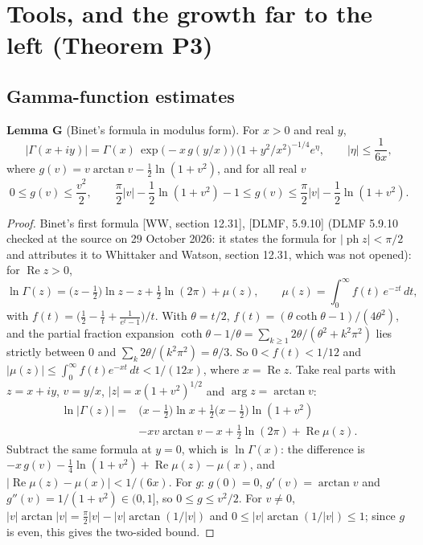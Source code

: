 \documentclass[11pt]{article}
\newcommand{\re}{\operatorname{Re}}
\begin{document}
\section{Tools, and the growth far to the left (Theorem P3)}\label{sec:P3}

\subsection{Gamma-function estimates}

\noindent\textbf{Lemma G} (Binet's formula in modulus form). For $x>0$ and real $y$,
\[
|\Gamma(x+iy)|=\Gamma(x)\,\exp\bigl(-x\,g(y/x)\bigr)\,\bigl(1+y^2/x^2\bigr)^{-1/4}e^{\eta},\qquad|\eta|\le\frac{1}{6x},
\]
where $g(v)=v\arctan v-\frac12\ln(1+v^2)$, and for all real $v$
\[
0\le g(v)\le\frac{v^2}{2},\qquad \frac\pi2|v|-\frac12\ln(1+v^2)-1\le g(v)\le\frac\pi2|v|-\frac12\ln(1+v^2).
\]

\begin{proof}
Binet's first formula [WW, section 12.31], [DLMF, 5.9.10] (DLMF 5.9.10 checked at the source on 29 October 2026: it states the formula for $|\operatorname{ph}z|<\pi/2$ and attributes it to Whittaker and Watson, section 12.31, which was not opened): for $\re z>0$,
\[
\ln\Gamma(z)=\bigl(z-\tfrac12\bigr)\ln z-z+\tfrac12\ln(2\pi)+\mu(z),\qquad \mu(z)=\int_0^\infty f(t)\,e^{-zt}\,dt,
\]
with $f(t)=\bigl(\frac12-\frac1t+\frac{1}{e^t-1}\bigr)/t$. With $\theta=t/2$, $f(t)=(\theta\coth\theta-1)/(4\theta^2)$, and the partial fraction expansion $\coth\theta-1/\theta=\sum_{k\ge1}2\theta/(\theta^2+k^2\pi^2)$ lies strictly between $0$ and $\sum_k2\theta/(k^2\pi^2)=\theta/3$. So $0<f(t)<1/12$ and $|\mu(z)|\le\int_0^\infty f(t)e^{-xt}\,dt<1/(12x)$, where $x=\re z$. Take real parts with $z=x+iy$, $v=y/x$, $|z|=x(1+v^2)^{1/2}$ and $\arg z=\arctan v$:
\begin{align*}
\ln|\Gamma(z)|={}&\bigl(x-\tfrac12\bigr)\ln x+\tfrac12\bigl(x-\tfrac12\bigr)\ln(1+v^2)\\
&-xv\arctan v-x+\tfrac12\ln(2\pi)+\re\mu(z).
\end{align*}
Subtract the same formula at $y=0$, which is $\ln\Gamma(x)$: the difference is $-x\,g(v)-\frac14\ln(1+v^2)+\re\mu(z)-\mu(x)$, and $|\re\mu(z)-\mu(x)|<1/(6x)$. For $g$: $g(0)=0$, $g'(v)=\arctan v$ and $g''(v)=1/(1+v^2)\in(0,1]$, so $0\le g\le v^2/2$. For $v\ne0$, $|v|\arctan|v|=\frac\pi2|v|-|v|\arctan(1/|v|)$ and $0\le|v|\arctan(1/|v|)\le1$; since $g$ is even, this gives the two-sided bound.
\end{proof}
\end{document}
